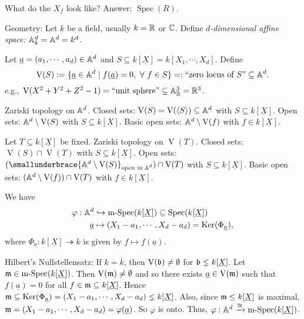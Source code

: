 \begin{question*}
    What do the $X_f$ look like? Answer: $\operatorname{Spec}(R)$.
\end{question*}

\begin{construction*}
    Geometry: Let $k$ be a field, usually $k = \mathbb{R}$ or $\mathbb{C}$. Define \emph{$d$-dimensional affine space:} $\mathbb{A}^d_k = \mathbb{A}^d = k^d$. \par 
    Let $\underline a = (a_1,\cdots,a_d) \in \mathbb{A}^d$ and $S \subseteq k[\underline X] = k[X_1,\cdots,X_d]$. Define
    \[\operatorname{V}(S) := \{\underline a \in \mathbb{A}^d \mid f(\underline a) = 0,\ \forall \  f \in S\} =: \text{``zero locus of $S$''} \subseteq \mathbb{A}^d.\] 
    e.g., $\operatorname{V}(X^2+Y^2+Z^2-1) = \text{``unit sphere''} \subseteq \mathbb{A}^3_{\mathbb{R}} = \mathbb{R}^3$. \par 
    Zariski topology on $\mathbb{A}^d$. Closed sets: $\operatorname{V}(S) = \operatorname{V}(\langle S \rangle) \subseteq \mathbb{A}^d$ with $S \subseteq k[\underline X]$. Open sets: $\mathbb{A}^d \setminus \operatorname{V}(S)$ with $S \subseteq k[\underline X]$. Basic open sets: $\mathbb{A}^d \setminus \operatorname{V}(f)$ with $f \in k[\underline X]$. \par 
    Let $T \subseteq k[\underline X]$ be fixed. Zariski topology on $\operatorname{V}(T)$. Closed sets: $\operatorname{V}(S) \cap \operatorname{V}(T)$ with $S \subseteq k[\underline X]$. Open sets: $(\smallunderbrace{\bbA^d \setminus \operatorname{V}(S)}_{\text{open in $\bbA^d$}}) \cap \operatorname{V}(T)$ with $S \subseteq k[\underline X]$.  Basic open sets: $(\mathbb{A}^d \setminus \operatorname{V}(f)) \cap \operatorname{V}(T)$ with $f \in k[\underline X]$. \par 
    We have 
    \begin{align*}
        \varphi: \mathbb{A}^d &\hookrightarrow \operatorname{m-Spec}(k[\underline X]) \subseteq \operatorname{Spec}(k[\underline X]) \\
        \underline a &\mapsto (X_1-a_1,\cdots,X_d-a_d) = \operatorname{Ker}(\Phi_{\underline a}), 
    \end{align*}
    where $\Phi_{\underline a}: k[\underline X] \twoheadrightarrow k$ is given by $f \mapsto f(\underline a)$. \par 
    Hilbert's Nullstellensatz: If $k = \overline k$, then $\operatorname{V}(\mathfrak{b}) \neq \emptyset$ for $\mathfrak{b} \lneq k[\underline X]$. Let $\mathfrak{m} \in \operatorname{m-Spec}(k[\underline X])$. Then $\operatorname{V}(\mathfrak{m}) \neq \emptyset$ and so there exists $\underline a \in \operatorname{V}(\mathfrak{m})$ such that $f(\underline a) = 0$ for all $f \in \mathfrak{m} \subseteq k[\underline X]$. Hence $\mathfrak{m} \subseteq \operatorname{Ker}(\Phi_{\underline a}) = (X_1-a_1,\cdots,X_d-a_d) \lneq k[\underline X]$. Also, since $\mathfrak{m} \leq k[\underline X]$ is maximal, $\mathfrak{m} = (X_1-a_1,\cdots,X_d-a_d) = \varphi(\underline a)$. So $\varphi$ is onto. Thus, $\varphi: \mathbb{A}^d \xrightarrow \cong \operatorname{m-Spec}(k[\underline X])$. \par 

\end{construction*}
